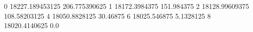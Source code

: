 0 18227.189453125 206.775390625
1 18172.3984375 151.984375
2 18128.99609375 108.58203125
4 18050.8828125 30.46875
6 18025.546875 5.1328125
8 18020.4140625 0.0
